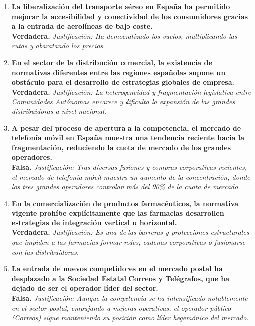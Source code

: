 \begin{enumerate}[label=\textbf{\arabic*.}]
    \item \textbf{La liberalización del transporte aéreo en España ha permitido mejorar la accesibilidad y conectividad de los consumidores gracias a la entrada de aerolíneas de bajo coste.} \\
    \textbf{Verdadera.} \textit{Justificación: Ha democratizado los vuelos, multiplicando las rutas y abaratando los precios.}

    \item \textbf{En el sector de la distribución comercial, la existencia de normativas diferentes entre las regiones españolas supone un obstáculo para el desarrollo de estrategias globales de empresa.} \\
    \textbf{Verdadera.} \textit{Justificación: La heterogeneidad y fragmentación legislativa entre Comunidades Autónomas encarece y dificulta la expansión de las grandes distribuidoras a nivel nacional.}

    \item \textbf{A pesar del proceso de apertura a la competencia, el mercado de telefonía móvil en España muestra una tendencia reciente hacia la fragmentación, reduciendo la cuota de mercado de los grandes operadores.} \\
    \textbf{Falsa.} \textit{Justificación: Tras diversas fusiones y compras corporativas recientes, el mercado de telefonía móvil muestra un aumento de la concentración, donde los tres grandes operadores controlan más del 90\% de la cuota de mercado.}

    \item \textbf{En la comercialización de productos farmacéuticos, la normativa vigente prohíbe explícitamente que las farmacias desarrollen estrategias de integración vertical u horizontal.} \\
    \textbf{Verdadera.} \textit{Justificación: Es una de las barreras y protecciones estructurales que impiden a las farmacias formar redes, cadenas corporativas o fusionarse con las distribuidoras.}

    \item \textbf{La entrada de nuevos competidores en el mercado postal ha desplazado a la Sociedad Estatal Correos y Telégrafos, que ha dejado de ser el operador líder del sector.} \\
    \textbf{Falsa.} \textit{Justificación: Aunque la competencia se ha intensificado notablemente en el sector postal, empujando a mejoras operativas, el operador público (Correos) sigue manteniendo su posición como líder hegemónico del mercado.}

\end{enumerate}

